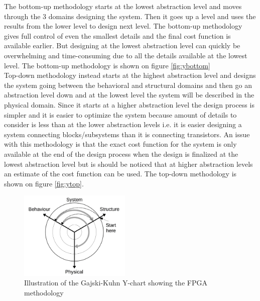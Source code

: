 The bottom-up methodology starts at the lowest abstraction level and moves through the 3 domains designing the system. Then it goes up a level and uses the results from the lower level to design next level. The bottom-up methodology gives full control of even the smallest details and the final cost function is available earlier. But designing at the lowest abstraction level can quickly be overwhelming and time-consuming due to all the details available at the lowest level. The bottom-up methodology is shown on figure \vref{fig:ybottom} \\

Top-down methodology instead starts at the highest abstraction level and designs the system going between the behavioral and structural domains and then go an abstraction level down and at the lowest level the system will be described in the physical domain. Since it starts at a higher abstraction level the design process is simpler and it is easier to optimize the system because amount of details to consider is less than at the lower abstraction levels i.e. it is easier designing a system connecting blocks/subsystems than it is connecting transistors. An issue with this methodology is that the exact cost function for the system is only available at the end of the design process when the design is finalized at the lowest abstraction level but is should be noticed that at higher abstraction levels an estimate of the cost function can be used. The top-down methodology is shown on figure \vref{fig:ytop}.\\

\begin{figure}[ht!]
  \centering
  \includegraphics[width=0.475\textwidth]{figures/ychart-fpga.jpg}
  \caption{Illustration of the Gajski-Kuhn Y-chart showing the FPGA methodology \cite{gajski2009}  \label{fig:ychart_fpga}}
\end{figure}

